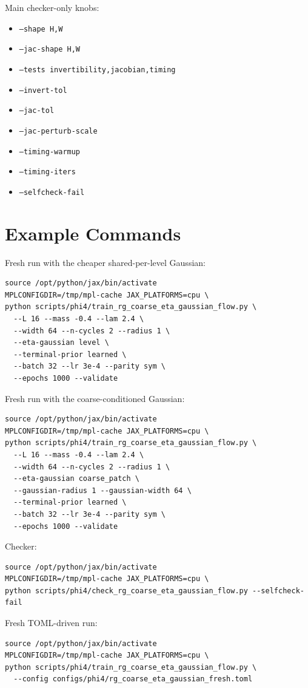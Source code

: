 \documentclass[11pt]{article}
\begin{document}
Main checker-only knobs:
\begin{itemize}
\item \texttt{--shape H,W}
\item \texttt{--jac-shape H,W}
\item \texttt{--tests invertibility,jacobian,timing}
\item \texttt{--invert-tol}
\item \texttt{--jac-tol}
\item \texttt{--jac-perturb-scale}
\item \texttt{--timing-warmup}
\item \texttt{--timing-iters}
\item \texttt{--selfcheck-fail}
\end{itemize}

\section{Example Commands}

Fresh run with the cheaper shared-per-level Gaussian:
\begin{verbatim}
source /opt/python/jax/bin/activate
MPLCONFIGDIR=/tmp/mpl-cache JAX_PLATFORMS=cpu \
python scripts/phi4/train_rg_coarse_eta_gaussian_flow.py \
  --L 16 --mass -0.4 --lam 2.4 \
  --width 64 --n-cycles 2 --radius 1 \
  --eta-gaussian level \
  --terminal-prior learned \
  --batch 32 --lr 3e-4 --parity sym \
  --epochs 1000 --validate
\end{verbatim}

Fresh run with the coarse-conditioned Gaussian:
\begin{verbatim}
source /opt/python/jax/bin/activate
MPLCONFIGDIR=/tmp/mpl-cache JAX_PLATFORMS=cpu \
python scripts/phi4/train_rg_coarse_eta_gaussian_flow.py \
  --L 16 --mass -0.4 --lam 2.4 \
  --width 64 --n-cycles 2 --radius 1 \
  --eta-gaussian coarse_patch \
  --gaussian-radius 1 --gaussian-width 64 \
  --terminal-prior learned \
  --batch 32 --lr 3e-4 --parity sym \
  --epochs 1000 --validate
\end{verbatim}

Checker:
\begin{verbatim}
source /opt/python/jax/bin/activate
MPLCONFIGDIR=/tmp/mpl-cache JAX_PLATFORMS=cpu \
python scripts/phi4/check_rg_coarse_eta_gaussian_flow.py --selfcheck-fail
\end{verbatim}

Fresh TOML-driven run:
\begin{verbatim}
source /opt/python/jax/bin/activate
MPLCONFIGDIR=/tmp/mpl-cache JAX_PLATFORMS=cpu \
python scripts/phi4/train_rg_coarse_eta_gaussian_flow.py \
  --config configs/phi4/rg_coarse_eta_gaussian_fresh.toml
\end{verbatim}
\end{document}
